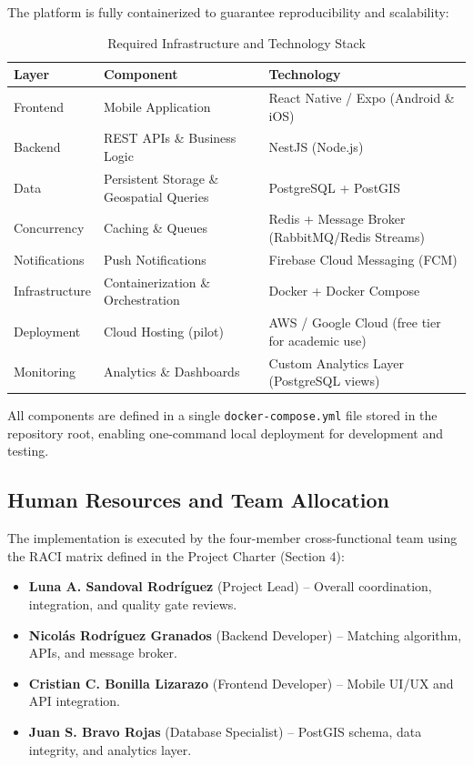 \documentclass[9pt,conference]{IEEEtran}
\begin{document}
The platform is fully containerized to guarantee reproducibility and scalability:

\begin{table}[h]
\centering
\small
\caption{Required Infrastructure and Technology Stack}
\label{tab:infrastructure}
\begin{tabular}{@{}p{1.5cm}p{2.0cm}p{3.5cm}@{}}
\toprule
\textbf{Layer} & \textbf{Component} & \textbf{Technology} \\
\midrule
Frontend & Mobile Application & React Native / Expo (Android \& iOS) \\
Backend & REST APIs \& Business Logic & NestJS (Node.js) \\
Data & Persistent Storage \& Geospatial Queries & PostgreSQL + PostGIS \\
Concurrency & Caching \& Queues & Redis + Message Broker (RabbitMQ/Redis Streams) \\
Notifications & Push Notifications & Firebase Cloud Messaging (FCM) \\
Infrastructure & Containerization \& Orchestration & Docker + Docker Compose \\
Deployment & Cloud Hosting (pilot) & AWS / Google Cloud (free tier for academic use) \\
Monitoring & Analytics \& Dashboards & Custom Analytics Layer (PostgreSQL views) \\
\bottomrule
\end{tabular}
\end{table}

All components are defined in a single \texttt{docker-compose.yml} file stored in the repository root, enabling one-command local deployment for development and testing.

\subsection{Human Resources and Team Allocation}

The implementation is executed by the four-member cross-functional team using the RACI matrix defined in the Project Charter (Section 4):

\begin{itemize}
    \item \textbf{Luna A. Sandoval Rodríguez} (Project Lead) – Overall coordination, integration, and quality gate reviews.
    \item \textbf{Nicolás Rodríguez Granados} (Backend Developer) – Matching algorithm, APIs, and message broker.
    \item \textbf{Cristian C. Bonilla Lizarazo} (Frontend Developer) – Mobile UI/UX and API integration.
    \item \textbf{Juan S. Bravo Rojas} (Database Specialist) – PostGIS schema, data integrity, and analytics layer.
\end{itemize}
\end{document}
